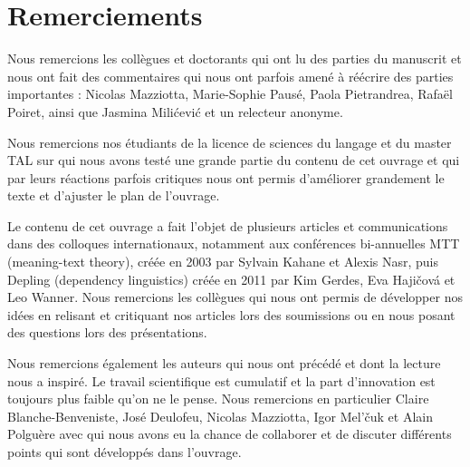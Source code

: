 \section{Remerciements}\label{sec:0.0.13}

Nous remercions les collègues et doctorants qui ont lu des parties du manuscrit et nous ont fait des commentaires qui nous ont parfois amené à réécrire des parties importantes : Nicolas Mazziotta, Marie-Sophie Pausé, Paola Pietrandrea, Rafaël Poiret, ainsi que Jasmina Milićević et un relecteur anonyme.

Nous remercions nos étudiants de la licence de sciences du langage et du master TAL sur qui nous avons testé une grande partie du contenu de cet ouvrage et qui par leurs réactions parfois critiques nous ont permis d’améliorer grandement le texte et d’ajuster le plan de l’ouvrage.

Le contenu de cet ouvrage a fait l’objet de plusieurs articles et communications dans des colloques internationaux, notamment aux conférences bi-annuelles MTT (meaning-text theory), créée en 2003 par Sylvain Kahane et Alexis Nasr, puis Depling (dependency linguistics) créée en 2011 par Kim Gerdes, Eva Hajičová et Leo Wanner. Nous remercions les collègues qui nous ont permis de développer nos idées en relisant et critiquant nos articles lors des soumissions ou en nous posant des questions lors des présentations.

Nous remercions également les auteurs qui nous ont précédé et dont la lecture nous a inspiré. Le travail scientifique est cumulatif et la part d’innovation est toujours plus faible qu’on ne le pense. Nous remercions en particulier Claire Blanche-Benveniste, José Deulofeu, Nicolas Mazziotta, Igor Mel’čuk et Alain Polguère avec qui nous avons eu la chance de collaborer et de discuter différents points qui sont développés dans l’ouvrage.


